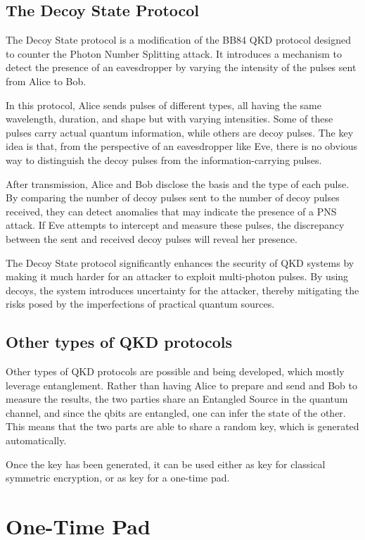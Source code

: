\subsection{The Decoy State Protocol}

The Decoy State protocol is a modification of the BB84 QKD protocol
designed to counter the Photon Number Splitting attack. It introduces
a mechanism to detect the presence of an eavesdropper by varying the
intensity of the pulses sent from Alice to Bob.

In this protocol, Alice sends pulses of different types, all having
the same wavelength, duration, and shape but with varying intensities.
Some of these pulses carry actual quantum information, while others
are decoy pulses. The key idea is that, from the perspective of an
eavesdropper like Eve, there is no obvious way to distinguish the
decoy pulses from the information-carrying pulses.

After transmission, Alice and Bob disclose the basis and the type of
each pulse. By comparing the number of decoy pulses sent to the number
of decoy pulses received, they can detect anomalies that may indicate
the presence of a PNS attack. If Eve attempts to intercept and measure
these pulses, the discrepancy between the sent and received decoy
pulses will reveal her presence.

The Decoy State protocol significantly enhances the security of QKD
systems by making it much harder for an attacker to exploit
multi-photon pulses. By using decoys, the system introduces
uncertainty for the attacker, thereby mitigating the risks posed by
the imperfections of practical quantum sources.

\subsection{Other types of QKD protocols}
Other types of QKD protocols are possible and being developed, which
mostly leverage entanglement. Rather than having Alice to prepare and
send and Bob to measure the results, the two parties share an 
Entangled Source in the quantum channel, and since the qbits are 
entangled, one can infer the state of the other. This means that the
two parts are able to share a random key, which is generated
automatically.

Once the key has been generated, it can be used either as key for
classical symmetric encryption, or as key for a one-time pad. 

\section{One-Time Pad} 

